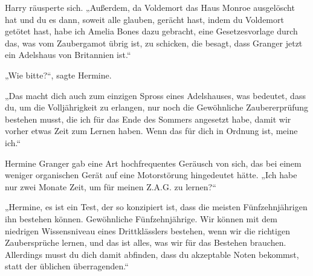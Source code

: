 Harry räusperte sich.
„Außerdem, da Voldemort das Haus Monroe ausgelöscht hat und du es dann, soweit alle glauben, gerächt hast, indem du Voldemort getötet hast, habe ich Amelia Bones dazu gebracht, eine Gesetzesvorlage durch das, was vom Zaubergamot übrig ist, zu schicken, die besagt, dass Granger jetzt ein Adelshaus von Britannien ist.“

„Wie bitte?“, sagte Hermine.

„Das macht dich auch zum einzigen Spross eines Adelshauses, was bedeutet, dass du, um die Volljährigkeit zu erlangen, nur noch die Gewöhnliche Zaubererprüfung bestehen musst, die ich für das Ende des Sommers angesetzt habe, damit wir vorher etwas Zeit zum Lernen haben. Wenn das für dich in Ordnung ist, meine ich.“

Hermine Granger gab eine Art hochfrequentes Geräusch von sich, das bei einem weniger organischen Gerät auf eine Motorstörung hingedeutet hätte.
„Ich habe nur zwei Monate Zeit, um für meinen Z.A.G. zu lernen?“

„Hermine, es ist ein Test, der so konzipiert ist, dass die meisten Fünfzehnjährigen ihn bestehen können. Gewöhnliche Fünfzehnjährige. Wir können mit dem niedrigen Wissensniveau eines Drittklässlers bestehen, wenn wir die richtigen Zaubersprüche lernen, und das ist alles, was wir für das Bestehen brauchen. Allerdings musst du dich damit abfinden, dass du akzeptable Noten bekommst, statt der üblichen überragenden.“

